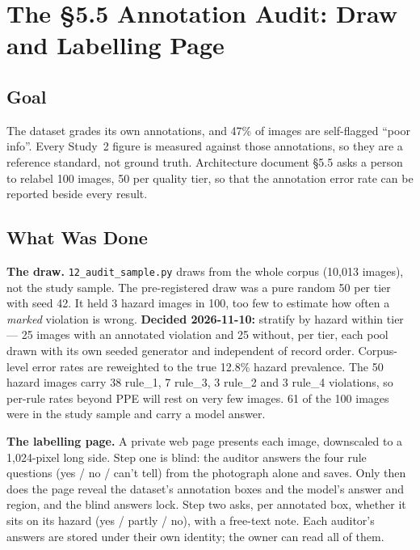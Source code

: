 \chapter{The \S5.5 Annotation Audit: Draw and Labelling Page}
\label{chap:s2-6}

\section{Goal}

The dataset grades its own annotations, and 47\% of images are self-flagged ``poor info''. Every Study~2
figure is measured against those annotations, so they are a reference standard, not ground truth.
Architecture document \S5.5 asks a person to relabel 100 images, 50 per quality tier, so that the
annotation error rate can be reported beside every result.

\section{What Was Done}

\textbf{The draw.} \texttt{12\_audit\_sample.py} draws from the whole corpus (10,013 images), not the study
sample. The pre-registered draw was a pure random 50 per tier with seed 42. It held 3 hazard images in 100,
too few to estimate how often a \emph{marked} violation is wrong. \textbf{Decided 2026-11-10:} stratify by
hazard within tier --- 25 images with an annotated violation and 25 without, per tier, each pool drawn with
its own seeded generator and independent of record order. Corpus-level error rates are reweighted to the
true 12.8\% hazard prevalence. The 50 hazard images carry 38 rule\_1, 7 rule\_3, 3 rule\_2 and 3 rule\_4
violations, so per-rule rates beyond PPE will rest on very few images. 61 of the 100 images were in the
study sample and carry a model answer.

\textbf{The labelling page.} A private web page presents each image, downscaled to a 1,024-pixel long side.
Step one is blind: the auditor answers the four rule questions (yes / no / can't tell) from the photograph
alone and saves. Only then does the page reveal the dataset's annotation boxes and the model's answer and
region, and the blind answers lock. Step two asks, per annotated box, whether it sits on its hazard (yes /
partly / no), with a free-text note. Each auditor's answers are stored under their own identity; the owner
can read all of them.

